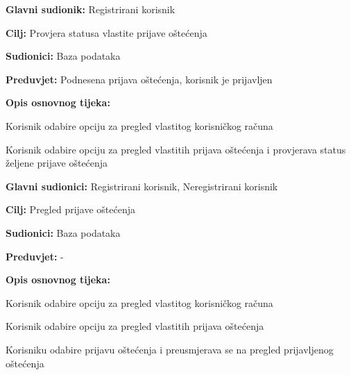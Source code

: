 \noindent {}
\begin{packed_item}

	\item \textbf{Glavni sudionik: } Registrirani korisnik
	\item  \textbf{Cilj:} Provjera statusa vlastite prijave oštećenja
	\item  \textbf{Sudionici:} Baza podataka
	\item  \textbf{Preduvjet:} Podnesena prijava oštećenja, korisnik je prijavljen
	\item  \textbf{Opis osnovnog tijeka:}

	\item[] \begin{packed_enum}

		\item Korisnik odabire opciju za pregled vlastitog korisničkog računa
		\item Korisnik odabire opciju za pregled vlastitih prijava oštećenja i provjerava status željene prijave oštećenja
	\end{packed_enum}
\end{packed_item}


\noindent {}
\begin{packed_item}

	\item \textbf{Glavni sudionici: } Registrirani korisnik, Neregistrirani korisnik
	\item  \textbf{Cilj:} Pregled prijave oštećenja
	\item  \textbf{Sudionici:} Baza podataka
	\item  \textbf{Preduvjet:} -
	\item  \textbf{Opis osnovnog tijeka:}

	\item[] \begin{packed_enum}

		\item Korisnik odabire opciju za pregled vlastitog korisničkog računa
		\item Korisnik odabire opciju za pregled vlastitih prijava oštećenja
		\item Korisniku odabire prijavu oštećenja i preusmjerava se na pregled prijavljenog oštećenja
	\end{packed_enum}
\end{packed_item}


